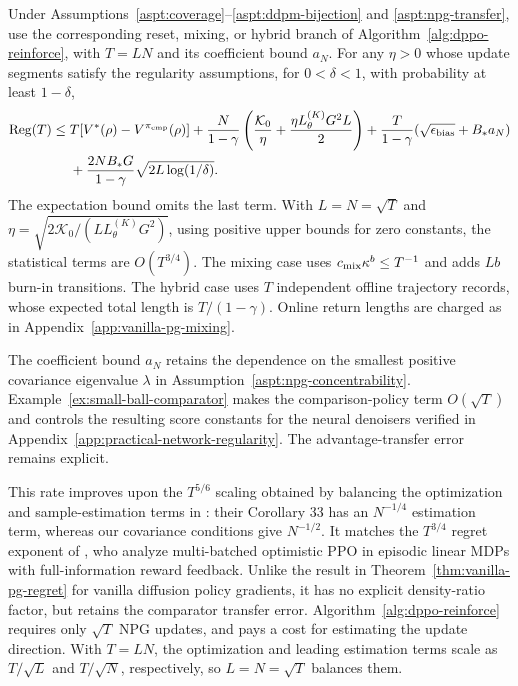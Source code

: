 \begin{thm}\label{thm:npg-regret}
Under Assumptions~\ref{aspt:coverage}--\ref{aspt:ddpm-bijection} and \ref{aspt:npg-transfer}, use the corresponding reset, mixing, or hybrid branch of Algorithm~\ref{alg:dppo-reinforce}, with $T=LN$ and its coefficient bound $a_N$. For any $\eta>0$ whose update segments satisfy the regularity assumptions, for $0<\delta<1$, with probability at least $1-\delta$,
\begin{align*}
\mathrm{Reg}(T)\leq{}&T[V^*(\rho)-V^{\pi_{\rm cmp}}(\rho)]+
\frac{N}{1-\gamma}\left(\frac{\mathcal K_0}\eta+
\frac{\eta L_\theta^{(K)}G^2L}{2}\right)
+\frac{T}{1-\gamma}(\sqrt{\epsilon_{\rm bias}}+B_*a_N)\\
&+\frac{2NB_*G}{1-\gamma}\sqrt{2L\log(1/\delta)}.
\end{align*}
The expectation bound omits the last term. With $L=N=\sqrt T$ and $\eta=\sqrt{2\mathcal K_0/(LL_\theta^{(K)}G^2)}$, using positive upper bounds for zero constants, the statistical terms are $O(T^{3/4})$. The mixing case uses $c_{\rm mix}\kappa^b\leq T^{-1}$ and adds $Lb$ burn-in transitions. The hybrid case uses $T$ independent offline trajectory records, whose expected total length is $T/(1-\gamma)$. Online return lengths are charged as in Appendix~\ref{app:vanilla-pg-mixing}. 
\end{thm}
The coefficient bound $a_N$ retains the dependence on the smallest positive covariance eigenvalue $\lambda$ in Assumption~\ref{aspt:npg-concentrability}. Example~\ref{ex:small-ball-comparator} makes the comparison-policy term $O(\sqrt T)$ and controls the resulting score constants for the neural denoisers verified in Appendix~\ref{app:practical-network-regularity}. The advantage-transfer error remains explicit.




This rate improves upon the $T^{5/6}$ scaling obtained by balancing the optimization and sample-estimation terms in \citet{agarwal2021theory}: their Corollary 33 has an $N^{-1/4}$ estimation term, whereas our covariance conditions give $N^{-1/2}$. It matches the $T^{3/4}$ regret exponent of \citet{zhong2023theoretical}, who analyze multi-batched optimistic PPO in episodic linear MDPs with full-information reward feedback. Unlike the result in Theorem~\ref{thm:vanilla-pg-regret} for vanilla diffusion policy gradients, it has no explicit density-ratio factor, but retains the comparator transfer error. Algorithm~\ref{alg:dppo-reinforce} requires only $\sqrt T$ NPG updates, and pays a cost for estimating the update direction. With $T=LN$, the optimization and leading estimation terms scale as $T/\sqrt L$ and $T/\sqrt N$, respectively, so $L=N=\sqrt T$ balances them.

